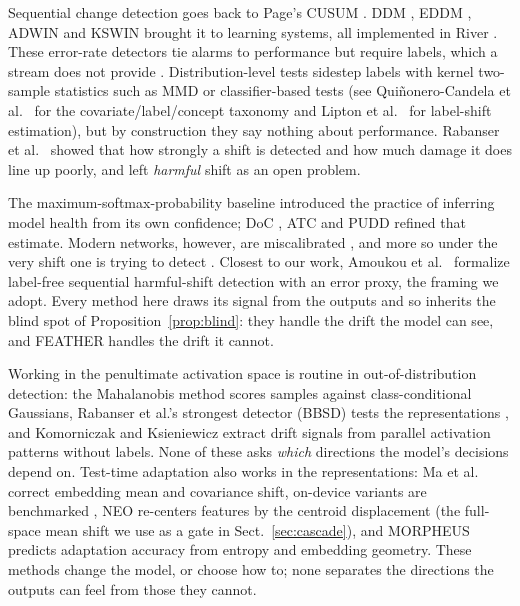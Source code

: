 \documentclass[graybox]{SNmult}
\begin{document}
Sequential change detection goes back to Page's CUSUM \cite{page1954cusum}.
DDM \cite{gama2004learning}, EDDM \cite{baena2006eddm}, ADWIN
\cite{bifet2007adwin} and KSWIN \cite{raab2020kswin} brought it to learning
systems, all implemented in River \cite{montiel2021river}. These
error-rate detectors tie alarms to performance but require labels, which a
stream does not provide \cite{gama2014survey, lu2018learning}. Distribution-level tests sidestep labels
with kernel two-sample statistics such as MMD \cite{gretton2012kernel} or
classifier-based tests (see Qui\~{n}onero-Candela et al.\ \cite{quinonero2009dataset}
for the covariate/label/concept taxonomy and Lipton et al.\ \cite{lipton2018label}
for label-shift estimation),
but by construction they say nothing about performance. Rabanser et al.\
\cite{rabanser2019failing} showed that how strongly a shift is detected and how
much damage it does line up poorly, and left \emph{harmful} shift as an open
problem.

The maximum-softmax-probability baseline \cite{hendrycks2017baseline}
introduced the practice of inferring model health from its own confidence; DoC
\cite{guillory2021doc}, ATC \cite{garg2022atc} and PUDD \cite{pudd2025}
refined that estimate. Modern networks, however, are miscalibrated
\cite{guo2017calibration}, and more so under the very shift one is trying to
detect \cite{ovadia2019trust}. Closest to our work, Amoukou et al.\
\cite{amoukou2024sequential} formalize label-free sequential harmful-shift
detection with an error proxy, the framing we adopt. Every method here draws its signal from the outputs
and so inherits the blind spot of Proposition~\ref{prop:blind}: they handle
the drift the model can see, and FEATHER handles the drift it cannot.

\runinhead{Feature space and test-time adaptation.}
Working in the penultimate activation space is routine in out-of-distribution
detection: the Mahalanobis method \cite{lee2018mahalanobis} scores samples
against class-conditional Gaussians, Rabanser et al.'s strongest detector
(BBSD) tests the representations \cite{rabanser2019failing}, and Komorniczak
and Ksieniewicz \cite{komorniczak2024parallel} extract drift signals from
parallel activation patterns without labels. None of these asks \emph{which}
directions the model's decisions depend on. Test-time adaptation also works in
the representations: Ma et al.\ \cite{ma2026pea} correct embedding mean and
covariance shift, on-device variants are benchmarked
\cite{danilowski2026botta}, NEO \cite{murphy2026neo} re-centers features by the
centroid displacement (the full-space mean shift we use as a gate in
Sect.~\ref{sec:cascade}), and MORPHEUS \cite{danilowski2026morpheus} predicts
adaptation accuracy from entropy and embedding geometry. These methods change
the model, or choose how to; none separates the directions the outputs can
feel from those they cannot.
\end{document}
